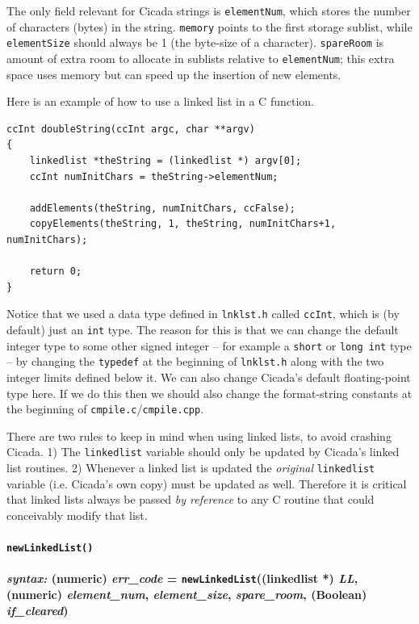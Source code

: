 \documentclass{article}
\newenvironment{code}{
       \begin{list}{}{
               \setlength{\leftmargin}{.4in}
               \setlength{\rightmargin}{0in}
               \setlength{\topsep}{.2in}
       }
       \small
       \item[] }
       { \end{list}   }
\begin{document}
\noindent The only field relevant for Cicada strings is \verb#elementNum#, which stores the number of characters (bytes) in the string.  \verb#memory# points to the first storage sublist, while \verb#elementSize# should always be 1 (the byte-size of a character).  \verb#spareRoom# is amount of extra room to allocate in sublists relative to \verb#elementNum#; this extra space uses memory but can speed up the insertion of new elements.

Here is an example of how to use a linked list in a C function.

\begin{code} \begin{verbatim}
ccInt doubleString(ccInt argc, char **argv)
{
    linkedlist *theString = (linkedlist *) argv[0];
    ccInt numInitChars = theString->elementNum;
    
    addElements(theString, numInitChars, ccFalse);
    copyElements(theString, 1, theString, numInitChars+1, numInitChars);
    
    return 0;
}
\end{verbatim} \end{code}

\noindent Notice that we used a data type defined in \verb#lnklst.h# called \verb#ccInt#, which is (by default) just an \verb#int# type.  The reason for this is that we can change the default integer type to some other signed integer -- for example a \verb#short# or \verb#long int# type -- by changing the \verb#typedef# at the beginning of \verb#lnklst.h# along with the two integer limits defined below it.  We can also change Cicada's default floating-point type here.  If we do this then we should also change the format-string constants at the beginning of \verb#cmpile.c#/\verb#cmpile.cpp#.

There are two rules to keep in mind when using linked lists, to avoid crashing Cicada.  1) The \verb#linkedlist# variable should only be updated by Cicada's linked list routines.  2) Whenever a linked list is updated the \emph{original} \verb#linkedlist# variable (i.e. Cicada's own copy) must be updated as well.  Therefore it is critical that linked lists always be passed \emph{by reference} to any C routine that could conceivably modify that list.\\


\paragraph{\texttt{newLinkedList()}\\\\
\normalfont \emph{syntax: } (numeric) \emph{err\_code} = \texttt{newLinkedList}((linkedlist *) \emph{LL}, (numeric) \emph{element\_num}, \emph{element\_size}, \emph{spare\_room}, (Boolean) \emph{if\_cleared})\\\\}
\end{document}
